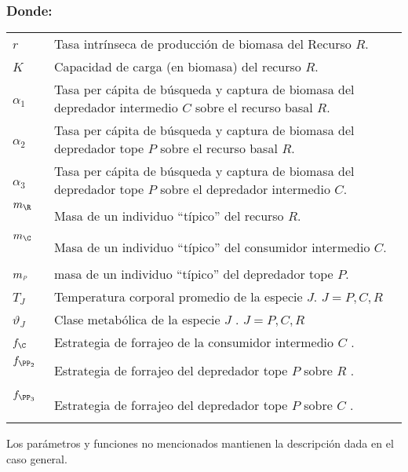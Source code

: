 \subsubsection*{Donde:}
\begin{longtable}{l@{:}p{5.8in}}
$r$  \ & Tasa intr\'inseca de producci\'on de biomasa del Recurso $R$.\\
$K$  \  &Capacidad de carga (en biomasa) del recurso $R$.\\
$\alpha_1$  \ & Tasa per c\'apita de b\'usqueda y captura de biomasa del depredador intermedio $C$ sobre  el recurso basal $R$.\\
$\alpha_2$ \ & Tasa per c\'apita de b\'usqueda y captura de biomasa del depredador tope $P$ sobre  el recurso basal $R$.\\
$\alpha_3$ \  &Tasa per c\'apita de b\'usqueda y captura de biomasa del depredador tope $P$ sobre  el depredador intermedio $C$.\\
$m_\R$  \ & Masa de un individuo ``t\'ipico'' del recurso $R$.\\
$m_\C$  \ & Masa de un individuo ``t\'ipico'' del consumidor intermedio $C$.\\
$m_\textit{\tiny P}$  \ & masa de un individuo ``t\'ipico'' del depredador tope $P$.\\
$T_J$ \ & Temperatura corporal promedio de la especie $J$. $J = P,C,R$ \\
$\vartheta_J$ \ & Clase metab\'olica de la especie $J$ . $J = P,C,R$ \\
$f_\C$ \ & Estrategia de forrajeo de la consumidor intermedio $C$ .\\
$f_{\PP_2}$ \ & Estrategia de forrajeo del depredador tope $P$ sobre $R$ .\\
$f_{\PP_3}$ \ & Estrategia de forrajeo del depredador tope $P$ sobre $C$ .\\

\end{longtable}

Los par\'ametros y funciones no mencionados mantienen la descripci\'on dada en el caso general.
